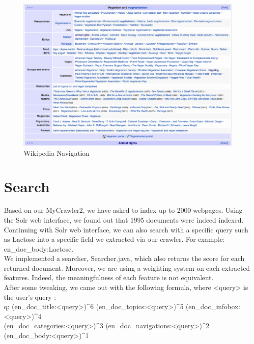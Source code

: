 \documentclass[a4paper]{article}
\begin{document}
\begin{figure}[H]
	\includegraphics[scale=0.5]{imgs/navigation}
	\caption{Wikipedia Navigation}
	\label{fig:navigation}
\end{figure}

\section{Search}
Based on our MyCrawler2, we have asked to index up to 2000 webpages. Using the Solr web interface, we found out that 1995 documents were indeed indexed.\\

Continuing with Solr web interface, we can also search with a specific query such as Lactose into a specific field we extracted via our crawler. For example: en\_doc\_body:Lactose. \\

We implemented a searcher, Searcher.java, which also returns the score for each returned document. Moreover, we are using a weighting system on each extracted features. Indeed, the meaningfulness of each feature is not equivalent. \\

After some tweaking, we came out with the following formula, where <query> is the user's query :\\

q: (en\_doc\_title:<query>)\^{}6 (en\_doc\_topics:<query>)\^{}5 (en\_doc\_infobox:<query>)\^{}4\\
(en\_doc\_categories:<query>)\^{}3 (en\_doc\_navigations:<query>)\^{}2 (en\_doc\_body:<query>)\^{}1\\
\end{document}
